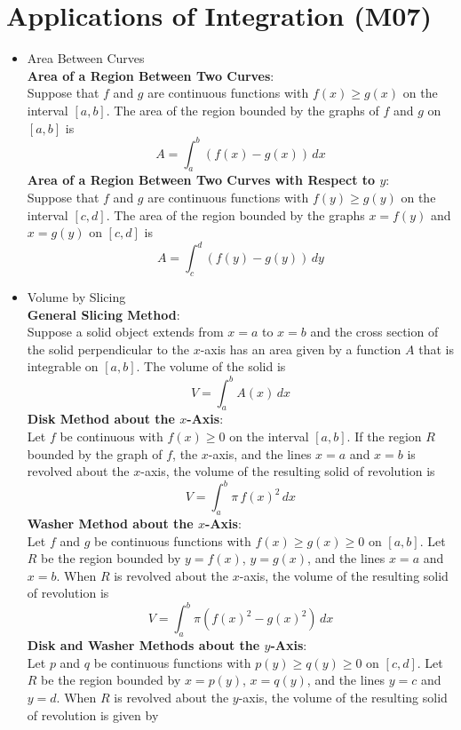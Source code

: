 \documentclass{article}
\begin{document}
\section*{Applications of Integration (M07)}
\begin{itemize}
    \item Area Between Curves \\
        \textbf{Area of a Region Between Two Curves}: \\
        Suppose that $f$ and $g$ are continuous functions with $f(x) \geq g(x)$ on the interval $[a,b]$. The area of the region bounded by the graphs of $f$ and $g$ on $[a,b]$ is
        $$A = \int_a^b{\left(f(x) - g(x)\right)\,dx}$$
        \textbf{Area of a Region Between Two Curves with Respect to $y$}: \\
        Suppose that $f$ and $g$ are continuous functions with $f(y) \geq g(y)$ on the interval $[c,d]$. The area of the region bounded by the graphs $x = f(y)$ and $x = g(y)$ on $[c,d]$ is
        $$A = \int_c^d{\left(f(y) - g(y)\right)\,dy}$$
    \item Volume by Slicing \\
        \textbf{General Slicing Method}: \\
        Suppose a solid object extends from $x = a$ to $x = b$ and the cross section of the solid perpendicular to the $x$-axis has an area given by a function $A$ that is integrable on $[a,b]$. The volume of the solid is
        $$V = \int_a^b{A(x)\,dx}$$
        \textbf{Disk Method about the $x$-Axis}: \\
        Let $f$ be continuous with $f(x) \geq 0$ on the interval $[a,b]$. If the region $R$ bounded by the graph of $f$, the $x$-axis, and the lines $x = a$ and $x = b$ is revolved about the $x$-axis, the volume of the resulting solid of revolution is
        $$V = \int_a^b{\pi\,f(x)^2\,dx}$$
        \textbf{Washer Method about the $x$-Axis}: \\
        Let $f$ and $g$ be continuous functions with $f(x) \geq g(x) \geq 0$ on $[a,b]$. Let $R$ be the region bounded by $y = f(x)$, $y = g(x)$, and the lines $x = a$ and $x = b$. When $R$ is revolved about the $x$-axis, the volume of the resulting solid of revolution is
        $$V = \int_a^b{\pi\left(f(x)^2 - g(x)^2\right)\,dx}$$
        \textbf{Disk and Washer Methods about the $y$-Axis}: \\
        Let $p$ and $q$ be continuous functions with $p(y) \geq q(y) \geq 0$ on $[c,d]$. Let $R$ be the region bounded by $x = p(y)$, $x = q(y)$, and the lines $y = c$ and $y = d$. When $R$ is revolved about the $y$-axis, the volume of the resulting solid of revolution is given by

\end{itemize}
\end{document}
